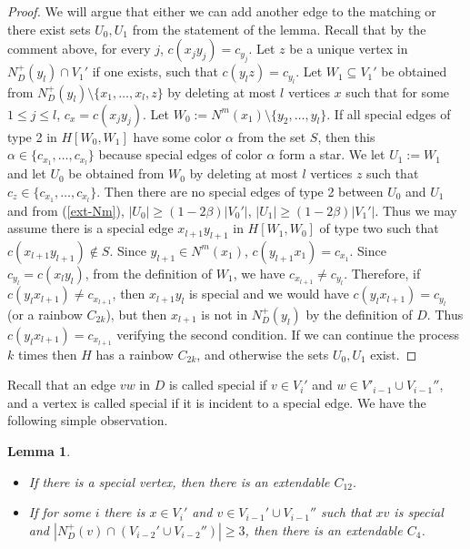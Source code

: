 \documentclass{article}
\newtheorem{lemma}[theorem]{Lemma}
\begin{document}
\begin{proof}
We will argue that either we can add another edge to the matching or there exist sets $U_0, U_1$ from the statement of the lemma. Recall that by the comment above, for every $j$, $c(x_jy_j)=c_{y_j}$.
Let $z$ be a unique vertex in $N^+_D(y_l)\cap V_1'$ if one exists, such that $c(y_lz)=c_{y_l}$.
Let $W_1\subseteq V_1'$ be obtained from $N^+_D(y_l)\setminus \{x_1,\dots, x_l, z\}$ by deleting at most $l$ vertices $x$ such that for some $1\leq j\leq l$, $c_x=c(x_jy_j).$
Let $W_0:=N^m(x_1)\setminus \{y_2, \dots, y_l\}.$ If all special edges of type 2 in $H[W_0,W_1]$ have some color $\alpha$ from the set $S$, then this $\alpha \in \{c_{x_1},\dots ,c_{x_l}\}$ because special edges of color $\alpha$ form a star. We let $U_1:= W_1$ and let $U_0$ be obtained from $W_0$ by deleting at most $l$ vertices $z$ such that $c_z\in \{c_{x_1},\dots ,c_{x_l}\}.$  Then there are no special edges of type 2 between $U_0$ and $U_1$ and from (\ref{ext-Nm}), $|U_0|\geq (1-2\beta)|V_0'|$, $|U_1|\geq (1-2\beta)|V_1'|$. Thus we may assume there is a special edge $x_{l+1}y_{l+1}$ in $H[W_1, W_0]$ of type two  such that $c(x_{l+1}y_{l+1})\notin S$. Since $y_{l+1}\in N^m(x_1)$, $c(y_{l+1}x_1)= c_{x_1}.$  Since $c_{y_l}=c(x_ly_l)$, from the definition of $W_1$, we have $c_{x_{l+1}}\neq c_{y_l}$. Therefore, if $c(y_lx_{l+1})\neq c_{x_{l+1}}$, then $x_{l+1}y_l$ is special and we would have $c(y_lx_{l+1})=c_{y_l}$ (or a rainbow $C_{2k}$), but then  $x_{l+1}$ is not in $N^+_D(y_l)$ by the definition of $D$. 
Thus $c(y_lx_{l+1})=c_{x_{l+1}}$ verifying the second condition. 
If we can continue the process $k$ times then $H$ has a rainbow $C_{2k}$, and otherwise the sets $U_0, U_1$ exist.

\end{proof}
 Recall that an edge $vw$ in $D$ is called special if $v\in V_i'$ and $w\in V'_{i-1}\cup V_{i-1}''$, and a vertex is called special if it is incident to a special edge. We have the following simple observation.
\begin{lemma}\label{ext-C12-C4-lem1}
\begin{itemize}
\item[(a)] If there is a special vertex, then there is an extendable $C_{12}.$
\item[(b)] If for some $i$ there is $x\in V_i'$ and $v\in V_{i-1}'\cup V_{i-1}''$ such that $xv$ is special and $|N^+_D(v)\cap (V_{i-2}'\cup V_{i-2}'')|\geq 3$, then there is an extendable $C_4$.
\end{itemize}
\end{lemma}
\end{document}
